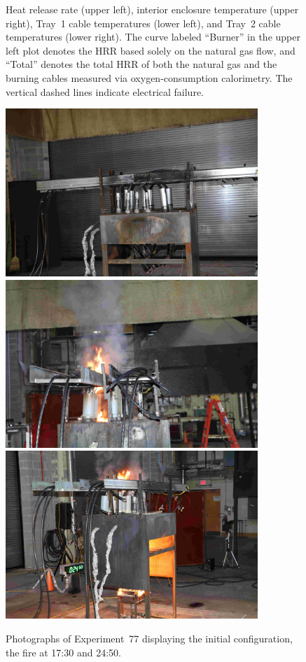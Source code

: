 \begin{figure}[H]
\caption[HRR and temperatures of Experiment 77]{Heat release rate (upper left), interior enclosure temperature (upper right), Tray~1 cable temperatures (lower left), and Tray~2 cable temperatures (lower right). The curve labeled ``Burner'' in the upper left plot denotes the HRR based solely on the natural gas flow, and ``Total'' denotes the total HRR of both the natural gas and the burning cables measured via oxygen-consumption calorimetry. The vertical dashed lines indicate electrical failure.}
\label{fig:Test_77}
\end{figure}

\begin{figure}[p]
\centering
\includegraphics[height=2.50in]{../FIGURES/Test_77_Photo_1} \\ \vspace{0.1in}
\includegraphics[height=2.50in]{../FIGURES/Test_77_Photo_2} \\ \vspace{0.1in}
\includegraphics[height=2.50in]{../FIGURES/Test_77_Photo_3}
\caption[Photographs of Experiment~77]{Photographs of Experiment~77 displaying the initial configuration, the fire at 17:30 and 24:50.}
\label{fig:Test_77_photos}
\end{figure}



